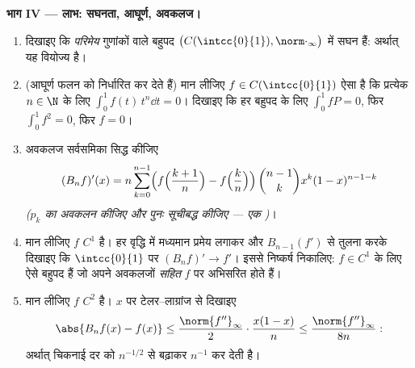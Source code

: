 \begin{problem}
\medskip
\noindent\textbf{भाग IV --- लाभ: सघनता, आघूर्ण, अवकलज।}
\begin{enumerate}[resume]
  \item दिखाइए कि \emph{परिमेय} गुणांकों वाले बहुपद $\bigl(C(\intcc{0}{1}),
        \norm\cdot_\infty\bigr)$ में सघन हैं:
        अर्थात् यह  वियोज्य है।
  \item (आघूर्ण फलन को निर्धारित कर देते हैं) मान लीजिए $f \in
        C(\intcc{0}{1})$ ऐसा है कि
        प्रत्येक $n \in \N$ के लिए $\int_0^1 f(t)\,t^n \dd t = 0$। दिखाइए कि हर बहुपद के लिए $\int_0^1 f P = 0$, फिर $\int_0^1 f^2 = 0$,
        फिर $f = 0$।
  \item अवकलज सर्वसमिका सिद्ध कीजिए
        \[
        (B_nf)'(x) = n\sum_{k=0}^{n-1}\Bigl(
        f\Bigl(\frac{k+1}{n}\Bigr) -
        f\Bigl(\frac kn\Bigr)\Bigr)\,
        \binom{n-1}{k}x^k(1-x)^{n-1-k}
        \]
        \emph{($p_k$ का अवकलन कीजिए और पुनः सूचीबद्ध कीजिए --- एक )}।
  \item मान लीजिए $f$ $C^1$ है। हर वृद्धि में मध्यमान प्रमेय लगाकर और
        $B_{n-1}(f')$ से तुलना करके दिखाइए कि $\intcc{0}{1}$ पर  $(B_nf)' \to f'$। इससे
        निष्कर्ष निकालिए: $f \in C^1$ के लिए ऐसे बहुपद हैं जो अपने अवकलजों
        \emph{सहित} $f$ पर अभिसरित होते हैं।
  \item मान लीजिए $f$ $C^2$ है। $x$ पर टेलर--लाग्रांज से दिखाइए
        \[
        \abs{B_nf(x) - f(x)} \leq
        \frac{\norm{f''}_\infty}{2}\cdot\frac{x(1-x)}{n}
        \leq \frac{\norm{f''}_\infty}{8n} :
        \]
        अर्थात् चिकनाई दर को $n^{-1/2}$ से बढ़ाकर $n^{-1}$ कर देती है।
\end{enumerate}


\end{problem}
